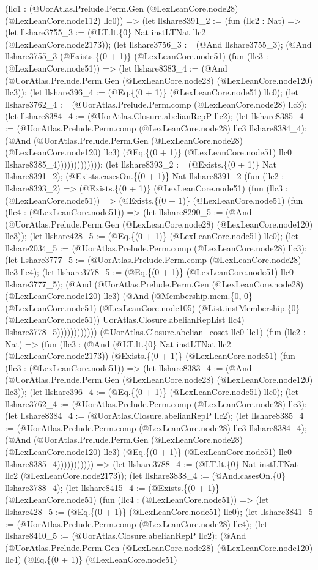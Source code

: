 \documentclass[11pt]{article}
\begin{document}
(llc1 : (@UorAtlas.Prelude.Perm.Gen (@LexLeanCore.node28) (@LexLeanCore.node112) llc0)) => (let llshare8391\_2 := (fun (llc2 : Nat) => (let llshare3755\_3 := (@LT.lt.\{0\} Nat instLTNat llc2 (@LexLeanCore.node2173)); (let llshare3756\_3 := (@And llshare3755\_3); (@And llshare3755\_3 (@Exists.\{(0 + 1)\} (@LexLeanCore.node51) (fun (llc3 : (@LexLeanCore.node51)) => (let llshare8383\_4 := (@And (@UorAtlas.Prelude.Perm.Gen (@LexLeanCore.node28) (@LexLeanCore.node120) llc3)); (let llshare396\_4 := (@Eq.\{(0 + 1)\} (@LexLeanCore.node51) llc0); (let llshare3762\_4 := (@UorAtlas.Prelude.Perm.comp (@LexLeanCore.node28) llc3); (let llshare8384\_4 := (@UorAtlas.Closure.abelianRepP llc2); (let llshare8385\_4 := (@UorAtlas.Prelude.Perm.comp (@LexLeanCore.node28) llc3 llshare8384\_4); (@And (@UorAtlas.Prelude.Perm.Gen (@LexLeanCore.node28) (@LexLeanCore.node120) llc3) (@Eq.\{(0 + 1)\} (@LexLeanCore.node51) llc0 llshare8385\_4))))))))))))); (let llshare8393\_2 := (@Exists.\{(0 + 1)\} Nat llshare8391\_2); (@Exists.casesOn.\{(0 + 1)\} Nat llshare8391\_2 (fun (llc2 : llshare8393\_2) => (@Exists.\{(0 + 1)\} (@LexLeanCore.node51) (fun (llc3 : (@LexLeanCore.node51)) => (@Exists.\{(0 + 1)\} (@LexLeanCore.node51) (fun (llc4 : (@LexLeanCore.node51)) => (let llshare8290\_5 := (@And (@UorAtlas.Prelude.Perm.Gen (@LexLeanCore.node28) (@LexLeanCore.node120) llc3)); (let llshare428\_5 := (@Eq.\{(0 + 1)\} (@LexLeanCore.node51) llc0); (let llshare2034\_5 := (@UorAtlas.Prelude.Perm.comp (@LexLeanCore.node28) llc3); (let llshare3777\_5 := (@UorAtlas.Prelude.Perm.comp (@LexLeanCore.node28) llc3 llc4); (let llshare3778\_5 := (@Eq.\{(0 + 1)\} (@LexLeanCore.node51) llc0 llshare3777\_5); (@And (@UorAtlas.Prelude.Perm.Gen (@LexLeanCore.node28) (@LexLeanCore.node120) llc3) (@And (@Membership.mem.\{0, 0\} (@LexLeanCore.node51) (@LexLeanCore.node105) (@List.instMembership.\{0\} (@LexLeanCore.node51)) UorAtlas.Closure.abelianRepList llc4) llshare3778\_5)))))))))))) (@UorAtlas.Closure.abelian\_coset llc0 llc1) (fun (llc2 : Nat) => (fun (llc3 : (@And (@LT.lt.\{0\} Nat instLTNat llc2 (@LexLeanCore.node2173)) (@Exists.\{(0 + 1)\} (@LexLeanCore.node51) (fun (llc3 : (@LexLeanCore.node51)) => (let llshare8383\_4 := (@And (@UorAtlas.Prelude.Perm.Gen (@LexLeanCore.node28) (@LexLeanCore.node120) llc3)); (let llshare396\_4 := (@Eq.\{(0 + 1)\} (@LexLeanCore.node51) llc0); (let llshare3762\_4 := (@UorAtlas.Prelude.Perm.comp (@LexLeanCore.node28) llc3); (let llshare8384\_4 := (@UorAtlas.Closure.abelianRepP llc2); (let llshare8385\_4 := (@UorAtlas.Prelude.Perm.comp (@LexLeanCore.node28) llc3 llshare8384\_4); (@And (@UorAtlas.Prelude.Perm.Gen (@LexLeanCore.node28) (@LexLeanCore.node120) llc3) (@Eq.\{(0 + 1)\} (@LexLeanCore.node51) llc0 llshare8385\_4))))))))))) => (let llshare3788\_4 := (@LT.lt.\{0\} Nat instLTNat llc2 (@LexLeanCore.node2173)); (let llshare3838\_4 := (@And.casesOn.\{0\} llshare3788\_4); (let llshare8415\_4 := (@Exists.\{(0 + 1)\} (@LexLeanCore.node51) (fun (llc4 : (@LexLeanCore.node51)) => (let llshare428\_5 := (@Eq.\{(0 + 1)\} (@LexLeanCore.node51) llc0); (let llshare3841\_5 := (@UorAtlas.Prelude.Perm.comp (@LexLeanCore.node28) llc4); (let llshare8410\_5 := (@UorAtlas.Closure.abelianRepP llc2); (@And (@UorAtlas.Prelude.Perm.Gen (@LexLeanCore.node28) (@LexLeanCore.node120) llc4) (@Eq.\{(0 + 1)\} (@LexLeanCore.node51) 
\end{document}
